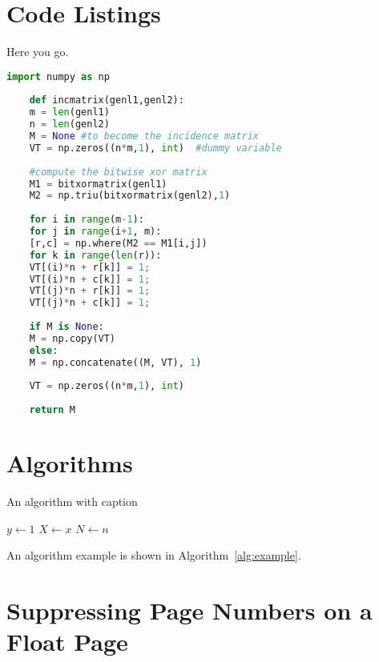 \blindtext

\section{Code Listings}

Here you go.

\begin{lstlisting}[language=Python,caption={My Listing Caption},captionpos=b]
	import numpy as np
	
	def incmatrix(genl1,genl2):
	m = len(genl1)
	n = len(genl2)
	M = None #to become the incidence matrix
	VT = np.zeros((n*m,1), int)  #dummy variable
	
	#compute the bitwise xor matrix
	M1 = bitxormatrix(genl1)
	M2 = np.triu(bitxormatrix(genl2),1) 
	
	for i in range(m-1):
	for j in range(i+1, m):
	[r,c] = np.where(M2 == M1[i,j])
	for k in range(len(r)):
	VT[(i)*n + r[k]] = 1;
	VT[(i)*n + c[k]] = 1;
	VT[(j)*n + r[k]] = 1;
	VT[(j)*n + c[k]] = 1;
	
	if M is None:
	M = np.copy(VT)
	else:
	M = np.concatenate((M, VT), 1)
	
	VT = np.zeros((n*m,1), int)
	
	return M
\end{lstlisting}

\blindtext

\section{Algorithms}


{}

\begin{algorithm}[hbt!]
	\caption{An algorithm with caption}\label{alg:example}
	$y \gets 1$\;
	$X \gets x$\;
	$N \gets n$\;
\end{algorithm}

An algorithm example is shown in Algorithm~\ref{alg:example}. \blindtext

\section{Suppressing Page Numbers on a Float Page}

